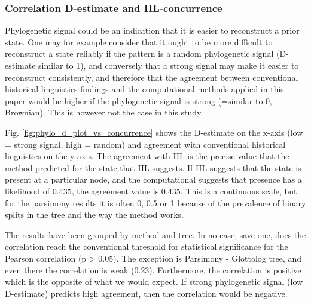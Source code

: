 \documentclass[12pt,letterpaper]{article}
\begin{document}
\FloatBarrier


\subsubsection{Correlation D-estimate and HL-concurrence}
\label{supp:cor_d_HL}
Phylogenetic signal could be an indication that it is easier to reconstruct a prior state. One may for example consider that it ought to be more difficult to reconstruct a state reliably if the pattern is a random phylogenetic signal (D-estimate similar to 1), and conversely that a strong signal may make it easier to reconstruct consistently, and therefore that the agreement between conventional historical linguistics findings and the computational methods applied in this paper would be higher if the phylogenetic signal is strong (=similar to 0, Brownian). This is however not the case in this study.

Fig. \ref{fig:phylo_d_plot_vs_concurrence} shows the D-estimate on the x-axis (low = strong signal, high = random) and agreement with conventional historical linguistics on the y-axis. The agreement with HL is the precise value that the method predicted for the state that HL suggests. If HL suggests that the state is present at a particular node, and the computational suggests that presence has a likelihood of 0.435, the agreement value is 0.435. This is a continuous scale, but for the parsimony results it is often 0, 0.5 or 1 because of the prevalence of binary splits in the tree and the way the method works.

The results have been grouped by method and tree. In no case, save one, does the correlation reach the conventional threshold for statistical significance for the Pearson correlation (p > 0.05). The exception is Parsimony - Glottolog tree, and even there the correlation is weak (0.23). Furthermore, the correlation is positive which is the opposite of what we would expect. If strong phylogenetic signal (low D-estimate) predicts high agreement, then the correlation would be negative. 
\end{document}
